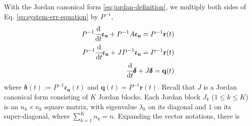 \documentclass[accepted]{uai2023}
\newcommand{\vect}[1]{\mathbf{#1}}
\newcommand{\dt}[1]{\cfrac{\mathrm{d} #1}{\mathrm{d} t}}
\newcommand{\Err}{\mathfrak{e}}
\begin{document}
    With the Jordan canonical form \ref{eq:jordan-definition}, we multiply both sides of Eq. \ref{eq:system-err-equation} by $P^{-1}$,
    \begin{align}
        P^{-1}\dt{}\Err_{\vect{u}} + P^{-1}A \Err_{\vect{u}} = P^{-1}\vect{r}(t) \\
        P^{-1}\dt{}\Err_{\vect{u}} + JP^{-1} \Err_{\vect{u}} = P^{-1}\vect{r}(t) \\
        \dt{}\pmb{\delta} + J \pmb{\delta}  = \vect{q}(t) 
    \end{align}
    where $\pmb{\delta}(t) := P^{-1}\Err_\vect{u}(t)$ and $\vect{q}(t) = P^{-1}\vect{r}(t)$. Recall that $J$ is a Jordan canonical form consisting of $K$ Jordan blocks. Each Jordan block $J_k$ ($1\leq k \leq K$) is an $n_k \times n_k$ square matrix, with eigenvalue $\lambda_k$ on its diagonal and $1$ on its super-diagonal, where $\sum_{k=1}^{K} n_k = n$. Expanding the vector notations, there is 
    \begingroup
        \newcommand{\?}[1]{\multicolumn{1}{c|}{#1}}
\end{document}
